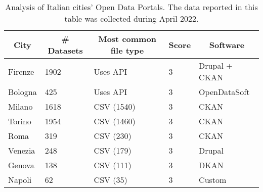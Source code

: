 \begin{table}[!ht]
  \onehalfspacing
  \centering
  \begin{tabular}{|l|l|l|l|l|}
    \hline
    \multicolumn{1}{|c|}{\textbf{City}} & \multicolumn{1}{c|}{\textbf{\# Datasets}} & \multicolumn{1}{c|}{\textbf{Most common file type}} & \multicolumn{1}{c|}{\textbf{Score}} & \multicolumn{1}{c|}{\textbf{Software}} \\ \hline
    Firenze                   & 1902                                             & Uses \acs{API}                                       & 3                                   & Drupal + CKAN \\ \hline
    Bologna                   & 425                                              & Uses \acs{API}                                       & 3                                   & OpenDataSoft  \\ \hline
    Milano                    & 1618                                             & CSV (1540)                                           & 3                                   & CKAN  \\ \hline
    Torino                    & 1954                                             & CSV (1460)                                           & 3                                   & CKAN  \\ \hline
    Roma                      & 319                                              & CSV (230)                                            & 3                                   & CKAN  \\ \hline
    Venezia                   & 248                                              & CSV (179)                                            & 3                                   & Drupal  \\ \hline
    Genova                    & 138                                              & CSV (111)                                            & 3                                   & DKAN  \\ \hline
    Napoli                    & 62                                               & CSV (35)                                             & 3                                   & Custom  \\ \hline
  \end{tabular}
  \caption{Analysis of Italian cities' Open Data Portals. The data reported in this table was collected during April 2022.}
  \label{tab:italian-cities}
\end{table}

